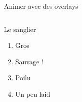 \documentclass[11pt]{beamer} %
\begin{document}
\begin{frame}{Animer avec des overlays}
  \begin{columns}[c] %
    	
    	\begin{block}{Le sanglier}
    		\begin{enumerate}
    			\item<+> Gros
				\item<+> Sauvage !    			
    			\item<+-> Poilu
    			\item<+> Un peu laid
    		\end{enumerate}
    	\end{block}
  \end{columns}
\end{frame}
\end{document}
